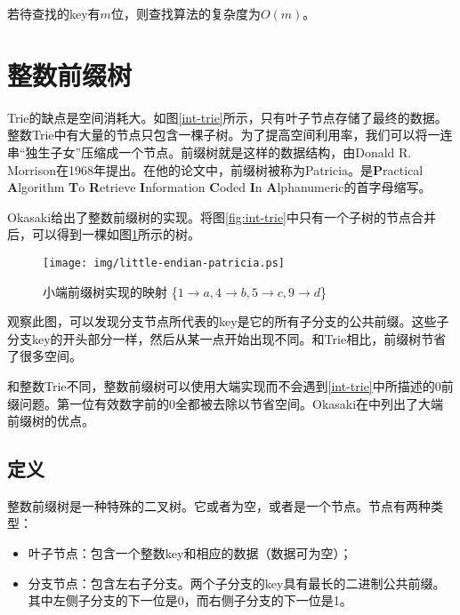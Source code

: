 \documentclass[UTF8]{article}
\begin{document}
若待查找的key有$m$位，则查找算法的复杂度为$O(m)$。

\section{整数前缀树}
\label{int-patricia}

Trie的缺点是空间消耗大。如图\ref{int-trie}所示，只有叶子节点存储了最终的数据。整数Trie中有大量的节点只包含一棵子树。为了提高空间利用率，我们可以将一连串“独生子女”压缩成一个节点。前缀树就是这样的数据结构，由Donald R. Morrison在1968年提出。在他的论文中，前缀树被称为Patricia。是\textbf{P}ractical \textbf{A}lgorithm \textbf{T}o \textbf{R}etrieve \textbf{I}nformation \textbf{C}oded \textbf{I}n \textbf{A}lphanumeric的首字母缩写\cite{patricia-morrison}。

Okasaki给出了整数前缀树的实现\cite{okasaki-int-map}。将图\ref{fig:int-trie}中只有一个子树的节点合并后，可以得到一棵如图\ref{fig:little-endian-patricia}所示的树。

\begin{figure}[htbp]
  \centering
  \texttt{[image: img/little-endian-patricia.ps]}
  \caption{小端前缀树实现的映射
     \{$ 1 \rightarrow a, 4 \rightarrow b, 5 \rightarrow c, 9 \rightarrow d$\}}
  \label{fig:little-endian-patricia}
\end{figure}

观察此图，可以发现分支节点所代表的key是它的所有子分支的公共前缀。这些子分支key的开头部分一样，然后从某一点开始出现不同。和Trie相比，前缀树节省了很多空间。

和整数Trie不同，整数前缀树可以使用大端实现而不会遇到\ref{int-trie}中所描述的0前缀问题。第一位有效数字前的0全都被去除以节省空间。Okasaki在\cite{okasaki-int-map}中列出了大端前缀树的优点。

\subsection{定义}

整数前缀树是一种特殊的二叉树。它或者为空，或者是一个节点。节点有两种类型：

\begin{itemize}
\item 叶子节点：包含一个整数key和相应的数据（数据可为空）；
\item 分支节点：包含左右子分支。两个子分支的key具有最长的二进制公共前缀。其中左侧子分支的下一位是0，而右侧子分支的下一位是1。
\end{itemize}
\end{document}
